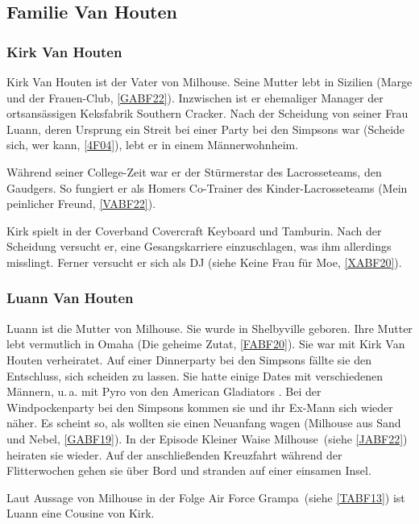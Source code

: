 {\subsection{Familie Van Houten}
 
\subsubsection{Kirk Van Houten}\label{KirkVanHouten}
Kirk Van Houten ist der Vater von Milhouse. Seine Mutter lebt in Sizilien (\glqq Marge und der Frauen-Club\grqq , \ref{GABF22}). Inzwischen ist er ehemaliger Manager der ortsansässigen Keksfabrik \glqq Southern Cracker\grqq . Nach der Scheidung von seiner Frau Luann, deren Ursprung ein Streit bei einer Party bei den Simpsons war (\glqq Scheide sich, wer kann\grqq , \ref{4F04}), lebt er in einem Männer\-wohn\-heim.

Während seiner College-Zeit war er der Stürmerstar des Lacrosseteams, den \glqq Gaudgers\grqq. So fungiert er als Homers Co-Trainer des Kinder-Lacrosseteams (\glqq Mein peinlicher Freund\grqq , \ref{VABF22}).

Kirk spielt in der Coverband Covercraft Keyboard und Tamburin. Nach der Scheidung versucht er, eine Gesangskarriere einzuschlagen, was ihm allerdings misslingt. Ferner versucht er sich als DJ (siehe \glqq Keine Frau für Moe\grqq, \ref{XABF20}).

\subsubsection{Luann Van Houten}\label{LuannVanHouten}
Luann ist die Mutter von Milhouse. Sie wurde in Shelbyville geboren. Ihre Mutter lebt vermutlich in Omaha (\glqq Die geheime Zutat\grqq , \ref{FABF20}). Sie war mit Kirk Van Houten verheiratet. Auf einer Dinnerparty bei den Simpsons fällte sie den Entschluss, sich scheiden zu lassen. Sie hatte einige Dates mit verschiedenen Männern, u.\,a. mit Pyro von den American Gladiators \cite{SpringfieldAt}. Bei der Windpockenparty bei den Simpsons kommen sie und ihr Ex-Mann sich wieder näher. Es scheint so, als wollten sie einen Neuanfang wagen (\glqq Milhouse aus Sand und Nebel\grqq , \ref{GABF19}). In der Episode \glqq Kleiner Waise Milhouse\grqq\ (siehe \ref{JABF22}) heiraten sie wieder. Auf der anschließenden Kreuzfahrt während der Flitterwochen gehen sie über Bord und stranden auf einer einsamen Insel.

Laut Aussage von Milhouse in der Folge \glqq Air Force Grampa\grqq\ (siehe \ref{TABF13}) ist Luann eine Cousine von Kirk.

}
